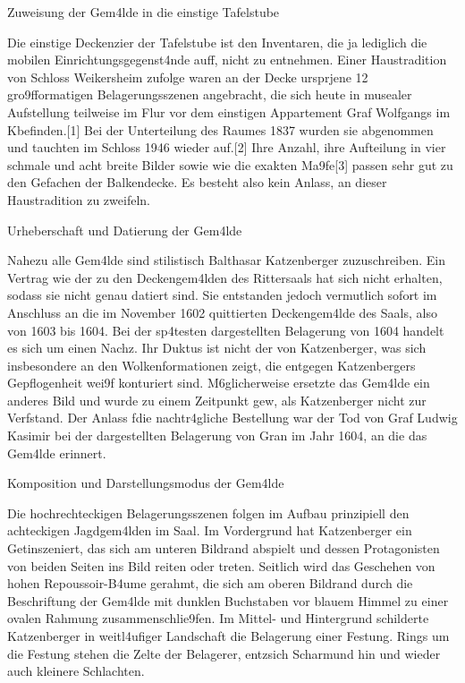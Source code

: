 \documentclass[
  letterpaper,
]{book}
\begin{document}
Zuweisung der Gem\xa4lde in die einstige Tafelstube

Die einstige Deckenzier der Tafelstube ist den Inventaren, die ja
lediglich die mobilen Einrichtungsgegenst\xa4nde auff\xbchren,
nicht zu entnehmen. Einer Haustradition von Schloss Weikersheim zufolge
waren an der Decke urspr\xbcnglich jene 12 gro\x9fformatigen
Belagerungsszenen angebracht, die sich heute in musealer Aufstellung
teilweise im Flur vor dem einstigen Appartement Graf Wolfgangs im
K\xbcchenbau befinden.{[}1{]} Bei der Unterteilung des Raumes 1837
wurden sie abgenommen und tauchten im Schloss 1946 wieder auf.{[}2{]}
Ihre Anzahl, ihre Aufteilung in vier schmale und acht breite Bilder
sowie wie die exakten Ma\x9fe{[}3{]} passen sehr gut zu den Gefachen
der Balkendecke. Es besteht also kein Anlass, an dieser Haustradition zu
zweifeln.

Urheberschaft und Datierung der Gem\xa4lde

Nahezu alle Gem\xa4lde sind stilistisch Balthasar Katzenberger
zuzuschreiben. Ein Vertrag wie der zu den Deckengem\xa4lden des
Rittersaals hat sich nicht erhalten, sodass sie nicht genau datiert
sind. Sie entstanden jedoch vermutlich sofort im Anschluss an die im
November 1602 quittierten Deckengem\xa4lde des Saals, also von 1603
bis 1604. Bei der sp\xa4testen dargestellten Belagerung von 1604
handelt es sich um einen Nachz\xbcgler. Ihr Duktus ist nicht der von
Katzenberger, was sich insbesondere an den Wolkenformationen zeigt, die
entgegen Katzenbergers Gepflogenheit wei\x9f konturiert sind.
M\xb6glicherweise ersetzte das Gem\xa4lde ein anderes Bild und
wurde zu einem Zeitpunkt gew\xbcnscht, als Katzenberger nicht zur
Verf\xbcgung stand. Der Anlass f\xbcr die nachtr\xa4gliche
Bestellung war der Tod von Graf Ludwig Kasimir bei der dargestellten
Belagerung von Gran im Jahr 1604, an die das Gem\xa4lde erinnert.

Komposition und Darstellungsmodus der Gem\xa4lde

Die hochrechteckigen Belagerungsszenen folgen im Aufbau prinzipiell den
achteckigen Jagdgem\xa4lden im Saal. Im Vordergrund hat Katzenberger
ein Get\xbcmmel inszeniert, das sich am unteren Bildrand abspielt
und dessen Protagonisten von beiden Seiten ins Bild reiten oder treten.
Seitlich wird das Geschehen von hohen Repoussoir-B\xa4ume gerahmt,
die sich am oberen Bildrand durch die Beschriftung der Gem\xa4lde
mit dunklen Buchstaben vor blauem Himmel zu einer ovalen Rahmung
zusammenschlie\x9fen. Im Mittel- und Hintergrund schilderte
Katzenberger in weitl\xa4ufiger Landschaft die Belagerung einer
Festung. Rings um die Festung stehen die Zelte der Belagerer,
entz\xbcnden sich Scharm\xbctzel und hin und wieder auch
kleinere Schlachten.
\end{document}
